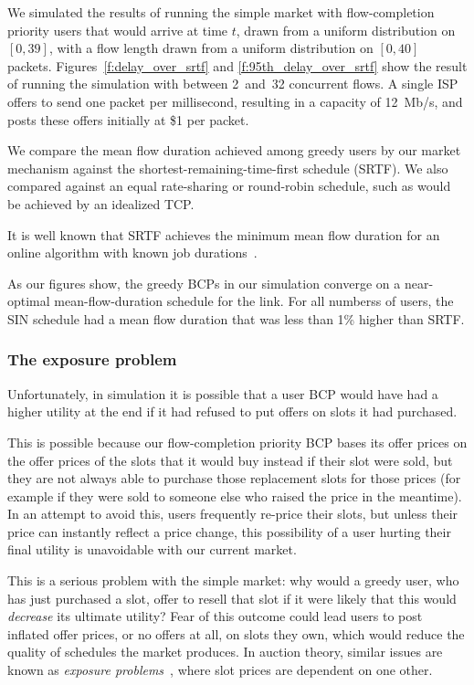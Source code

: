 We simulated the results of running the simple market with
flow-completion priority users that would arrive at time $t$, drawn
from a uniform distribution on $[0, 39]$, with a flow length drawn
from a uniform distribution on $[0, 40]$ packets.
Figures~\ref{f:delay_over_srtf} and \ref{f:95th_delay_over_srtf} show
the result of running the simulation with between 2~and~32 concurrent
flows. A single ISP offers to send one packet per millisecond,
resulting in a capacity of 12~Mb/s, and posts these offers initially at \$1 per
packet.

We compare the mean flow duration achieved among greedy users by our
market mechanism against the shortest-remaining-time-first schedule
(SRTF). We also compared against an equal rate-sharing or round-robin
schedule, such as would be achieved by an idealized TCP.

It is well known that SRTF achieves
the minimum mean flow duration for an online algorithm with
known job durations~\cite{karger10,bansal01}.

As our figures show, the greedy BCPs in our simulation converge on a
near-optimal mean-flow-duration schedule for the link. For all numberss
of users, the SIN schedule had a mean flow duration that was less
than 1\% higher than SRTF.

\subsubsection{The exposure problem}

Unfortunately, in simulation it is possible that a user BCP would have
had a higher utility at the end if it had refused to put offers on slots it had purchased.

This is possible because our flow-completion priority BCP bases its
offer prices on the offer prices of the slots that it would buy instead
if their slot were sold, but they are not always able to purchase
those replacement slots for those prices (for example if they were
sold to someone else who raised the price in the meantime). In an attempt to avoid
this, users frequently re-price their slots, but unless their price
can instantly reflect a price change, this possibility of a user
hurting their final utility is unavoidable with our current market.

This is a serious problem with the simple market: why would a greedy
user, who has just purchased a slot, offer to resell that slot if it
were likely that this would \emph{decrease} its ultimate utility?
Fear of this outcome could lead users to post inflated offer prices, or no offers at all, on
slots they own, which would reduce the quality of schedules the market
produces. In auction theory, similar issues are known as 
\emph{exposure problems}~\cite{milgrom00,
englmaier06}, where slot prices are dependent on one other.

